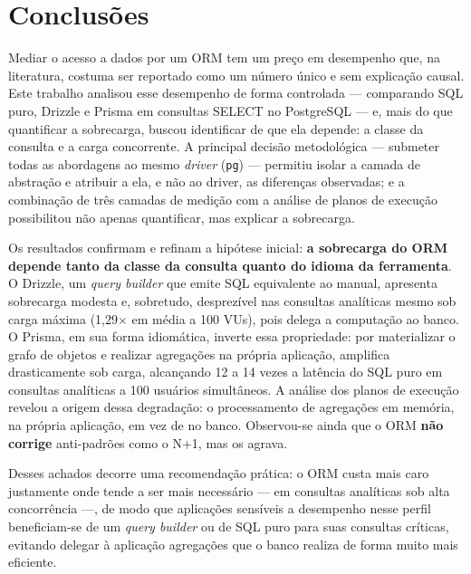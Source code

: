 \documentclass[12pt]{article}
\begin{document}
\section{Conclusões}

Mediar o acesso a dados por um ORM tem um preço em desempenho que, na
literatura, costuma ser reportado como um número único e sem explicação
causal. Este trabalho analisou esse desempenho de forma controlada ---
comparando SQL puro, Drizzle e Prisma em consultas SELECT no PostgreSQL
--- e, mais do que quantificar a sobrecarga, buscou identificar de que
ela depende: a classe da consulta e a carga concorrente. A principal
decisão metodológica --- submeter todas as abordagens ao mesmo
\textit{driver} (\texttt{pg}) --- permitiu isolar a camada de abstração e
atribuir a ela, e não ao driver, as diferenças observadas; e a
combinação de três camadas de medição com a análise de planos de execução
possibilitou não apenas quantificar, mas explicar a sobrecarga.

Os resultados confirmam e refinam a hipótese inicial: \textbf{a
sobrecarga do ORM depende tanto da classe da consulta quanto do idioma da
ferramenta}. O Drizzle, um \textit{query builder} que emite SQL
equivalente ao manual, apresenta sobrecarga modesta e, sobretudo,
desprezível nas consultas analíticas mesmo sob carga máxima (1,29$\times$
em média a 100 VUs), pois delega a computação ao banco. O Prisma, em sua
forma idiomática, inverte essa propriedade: por materializar o grafo de
objetos e realizar agregações na própria aplicação, amplifica
drasticamente sob carga, alcançando 12 a 14 vezes a latência do SQL puro
em consultas analíticas a 100 usuários simultâneos. A análise dos planos
de execução revelou a origem dessa degradação: o processamento de
agregações em memória, na própria aplicação, em vez de no banco.
Observou-se ainda que o ORM \textbf{não corrige} anti-padrões como o N+1,
mas os agrava.

Desses achados decorre uma recomendação prática: o ORM custa mais caro
justamente onde tende a ser mais necessário --- em consultas analíticas
sob alta concorrência ---, de modo que aplicações sensíveis a desempenho
nesse perfil beneficiam-se de um \textit{query builder} ou de SQL puro
para suas consultas críticas, evitando delegar à aplicação agregações que
o banco realiza de forma muito mais eficiente.



\end{document}
